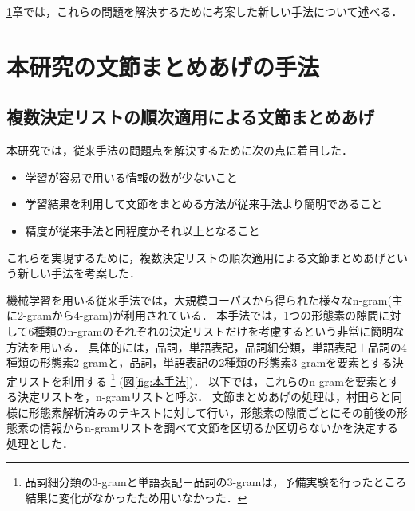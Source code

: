 \ref{sec:文節まとめあげ}章では，これらの問題を解決するために考案した新しい手法について述べる．



\section{本研究の文節まとめあげの手法}\label{sec:文節まとめあげ}

\subsection{複数決定リストの順次適用による文節まとめあげ}\label{subsec:複数決定リスト}

本研究では，従来手法の問題点を解決するために次の点に着目した．

\begin{itemize}
\item 学習が容易で用いる情報の数が少ないこと
\item 学習結果を利用して文節をまとめる方法が従来手法より簡明であること
\item 精度が従来手法と同程度かそれ以上となること
\end{itemize}
これらを実現するために，{\bold 複数決定リストの順次適用による文節まとめあげ}という新しい手法を考案した．

機械学習を用いる従来手法では，大規模コーパスから得られた様々なn-gram(主に2-gramから4-gram)が利用されている．
本手法では，1つの形態素の隙間に対して6種類のn-gramのそれぞれの決定リストだけを考慮するという非常に簡明な方法を用いる．
具体的には，品詞，単語表記，品詞細分類，単語表記＋品詞の4種類の形態素2-gramと，品詞，単語表記の2種類の形態素3-gramを要素とする決定リストを利用する
\footnote{
  品詞細分類の3-gramと単語表記＋品詞の3-gramは，予備実験を行ったところ結果に変化がなかったため用いなかった．
  }
(図\ref{fig:本手法})．
以下では，これらのn-gramを要素とする決定リストを，n-gramリストと呼ぶ．
文節まとめあげの処理は，村田らと同様に形態素解析済みのテキストに対して行い，形態素の隙間ごとにその前後の形態素の情報からn-gramリストを調べて文節を区切るか区切らないかを決定する処理とした．

